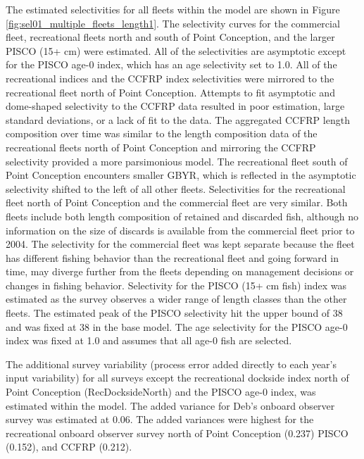 \documentclass[12pt,]{article}
\begin{document}
The estimated selectivities for all fleets within the model are shown in
Figure \ref{fig:sel01_multiple_fleets_length1}. The selectivity curves
for the commercial fleet, recreational fleets north and south of Point
Conception, and the larger PISCO (15+ cm) were estimated. All of the
selectivities are asymptotic except for the PISCO age-0 index, which has
an age selectivity set to 1.0. All of the recreational indices and the
CCFRP index selectivities were mirrored to the recreational fleet north
of Point Conception. Attempts to fit asymptotic and dome-shaped
selectivity to the CCFRP data resulted in poor estimation, large
standard deviations, or a lack of fit to the data. The aggregated CCFRP
length composition over time was similar to the length composition data
of the recreational fleets north of Point Conception and mirroring the
CCFRP selectivity provided a more parsimonious model. The recreational
fleet south of Point Conception encounters smaller GBYR, which is
reflected in the asymptotic selectivity shifted to the left of all other
fleets. Selectivities for the recreational fleet north of Point
Conception and the commercial fleet are very similar. Both fleets
include both length composition of retained and discarded fish, although
no information on the size of discards is available from the commercial
fleet prior to 2004. The selectivity for the commercial fleet was kept
separate because the fleet has different fishing behavior than the
recreational fleet and going forward in time, may diverge further from
the fleets depending on management decisions or changes in fishing
behavior. Selectivity for the PISCO (15+ cm fish) index was estimated as
the survey observes a wider range of length classes than the other
fleets. The estimated peak of the PISCO selectivity hit the upper bound
of 38 and was fixed at 38 in the base model. The age selectivity for the
PISCO age-0 index was fixed at 1.0 and assumes that all age-0 fish are
selected.

The additional survey variability (process error added directly to each
year's input variability) for all surveys except the recreational
dockside index north of Point Conception (RecDocksideNorth) and the
PISCO age-0 index, was estimated within the model. The added variance
for Deb's onboard observer survey was estimated at 0.06. The added
variances were highest for the recreational onboard observer survey
north of Point Conception (0.237) PISCO (0.152), and CCFRP (0.212).
\end{document}
